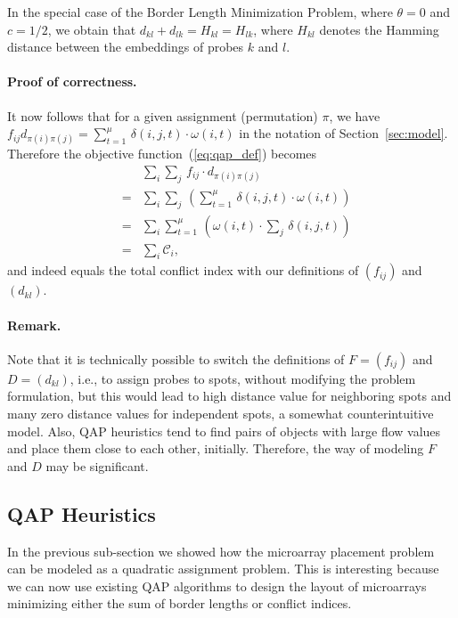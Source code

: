 \documentclass[english]{lni}
\begin{document}
In the special case of the Border Length Minimization Problem, where
$\theta=0$ and $c=1/2$, we obtain that $d_{kl} + d_{lk} = H_{kl} = H_{lk}$,
where $H_{kl}$ denotes the  Hamming distance between the embeddings of probes
$k$ and $l$.


\paragraph{Proof of correctness.}
It now follows that for a given assignment (permutation) $\pi$, we have
$f_{ij} d_{\pi(i)\pi(j)} = \sum_{t=1}^\mu\, \delta(i,j,t) \cdot \omega(i,t)$
in the notation of Section~\ref{sec:model}. Therefore the objective
function~(\ref{eq:qap_def}) becomes
\begin{eqnarray*}
  & & \sum_i \sum_j\, f_{ij} \cdot d_{\pi(i)\pi(j)}\\
  &=& \sum_i \sum_j\, \left( \sum_{t=1}^\mu\, \delta(i,j,t) \cdot \omega(i,t)  \right)\\
  &=& \sum_i \sum_{t=1}^\mu\, \left( \omega(i,t) \cdot \sum_j\, \delta(i,j,t)  \right)\\
  &=& \sum_i \mathcal{C}_i,
\end{eqnarray*}
and indeed equals the total conflict index with our definitions of $(f_{ij})$
and $(d_{kl})$.


\paragraph{Remark.} 
Note that it is technically possible to switch the definitions of $F=(f_{ij})$
and $D=(d_{kl})$, i.e., to assign probes to spots, without modifying the
problem formulation, but this would lead to high distance value for
neighboring spots and many zero distance values for independent spots, a somewhat
counterintuitive model. Also, QAP heuristics tend to find pairs of objects with
large flow values and place them close to each other, initially. Therefore, the
way of modeling $F$ and $D$ may be significant.


\subsection{QAP Heuristics}

In the previous sub-section we showed how the microarray placement problem can
be modeled as a quadratic assignment problem. This is interesting because we can
now use existing QAP algorithms to design the layout of microarrays minimizing
either the sum of border lengths or conflict indices. 
\end{document}
